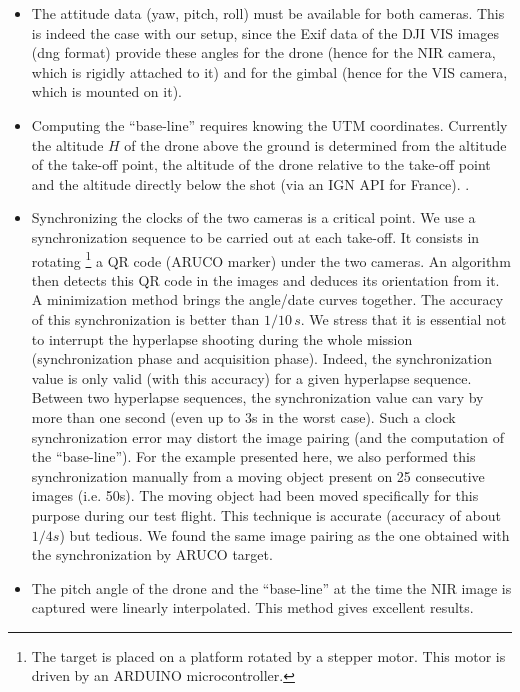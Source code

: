 \documentclass[a4paper,11pt]{report}
\begin{document}
\begin{itemize}
	\item The attitude data (yaw, pitch, roll) must be available for both cameras. This is indeed the case with our setup, since the Exif data of the DJI VIS images (dng format) provide these angles for the drone (hence for the NIR camera, which is rigidly attached to it) and for the gimbal (hence for the VIS camera, which is mounted on it).\\
	\item Computing the ``base-line'' requires knowing the UTM coordinates. Currently the altitude $H$ of the drone above the ground is determined from the altitude of the take-off point, the altitude of the drone relative to the take-off point and the altitude directly below the shot (via an IGN API for France). .\\
	\item Synchronizing the clocks of the two cameras is a critical point. We use a synchronization sequence to be carried out at each take-off. It consists in rotating
	\footnote{The target is placed on a platform rotated by a stepper motor. This motor is driven by an ARDUINO microcontroller.} a QR code (ARUCO marker) under the two cameras. An algorithm then detects this QR code in the images and deduces its orientation from it. A minimization method brings the angle/date curves together. The accuracy of this synchronization is better than $1/10\,s$. We stress that it is essential not to interrupt the hyperlapse shooting during the whole mission (synchronization phase and acquisition phase). Indeed, the synchronization value is only valid (with this accuracy) for a given hyperlapse sequence. Between two hyperlapse sequences, the synchronization value can vary by more than one second (even up to 3s in the worst case).
	Such a clock synchronization error may distort the image pairing (and the computation of the ``base-line'').
	For the example presented here, we also performed this synchronization manually from a moving object present on 25 consecutive images (i.e. 50s). The moving object had been moved specifically for this purpose during our test flight. This technique is accurate (accuracy of about $1/4 s$) but tedious. We found the same image pairing as the one obtained with the synchronization by ARUCO target. \\
	\item The pitch angle of the drone and the ``base-line'' at the time the NIR image is captured were linearly interpolated. This method gives excellent results.\\
\end{itemize}
\end{document}
